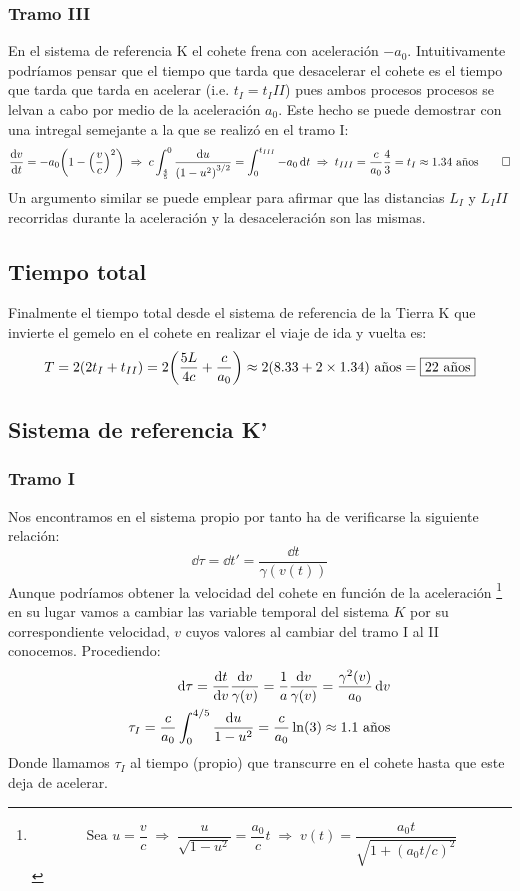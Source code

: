 \documentclass[11pt]{article}
\begin{document}
\subsubsection*{Tramo III} 
En el sistema de referencia K el cohete frena con aceleración $-a_0$. Intuitivamente podríamos pensar que el tiempo que tarda que desacelerar el cohete es el tiempo que tarda que tarda en acelerar (i.e. $t_I = t_III$) pues ambos procesos procesos se lelvan a cabo por medio de la aceleración $a_0$. Este hecho se puede demostrar con una intregal semejante a la que se realizó en el tramo I:
\begin{align*}
    \dv{v}{t} = -a_0 \qty(1 - \qty(\dfrac{v}{c})^2) \;\Rightarrow\; c\int_{\frac{4}{5}}^{0} \dfrac{\dd{u}}{\qty(1-u^2)^{3/2}} = \int_{0}^{t_{III}} -a_0 \dd{t} \;\Rightarrow\; t_{III} = \dfrac{c}{a_0}\dfrac{4}{3} = t_{I} \approx 1.34 \textrm{ años} \qed 
\end{align*}
Un argumento similar se puede emplear para afirmar que las distancias $L_I$ y $L_III$ recorridas durante la aceleración y la desaceleración son las mismas.
\subsection*{Tiempo total}
Finalmente el tiempo total desde el sistema de referencia de la Tierra K que invierte el gemelo en el cohete en realizar el viaje de ida y vuelta es: 
\begin{equation}
    T = 2(2t_I + t_{II}) = 2\qty(\dfrac{5L}{4c}+\dfrac{c}{a_0}) \approx 2(8.33 +2\times1.34) \textrm{ años} =  \fbox{\textrm{22 años}} 
\end{equation}
\subsection*{Sistema de referencia K'}
\subsubsection*{Tramo I}
Nos encontramos en el sistema propio por tanto ha de verificarse la siguiente relación: 
\begin{equation}
    \label{Tiempo propio}
    \dd{\tau} = \dd{t'} = \dfrac{\dd{t}}{\gamma(v(t))}
\end{equation}
Aunque podríamos obtener la velocidad del cohete en función de la aceleración \footnote{
    \begin{equation*}
        \textrm{Sea } u = \dfrac{v}{c} \;\Rightarrow\; \dfrac{u}{\sqrt{1-u^2}} = \dfrac{a_0}{c} t \;\Rightarrow\; v(t) = \dfrac{a_0 t}{\sqrt{1 + (a_0 t/c)^2}} 
    \end{equation*}
} en su lugar vamos a cambiar las variable temporal del sistema $K$ por su correspondiente velocidad, $v$ cuyos valores al cambiar del tramo I al II conocemos. Procediendo: 
\begin{align}
    \dd{\tau} = \dv{t}{v} \dfrac{\dd{v}}{\gamma(v)} = \dfrac{1}{a} \dfrac{\dd{v}}{\gamma(v)} = \dfrac{\gamma^2(v)}{a_0}\dd{v}\\
    \tau_I =  \dfrac{c}{a_0}\int_{0}^{4/5} \dfrac{\dd{u}}{1-u^2} = \dfrac{c }{a_0} \ln(3) \approx 1.1 \textrm{ años} 
\end{align} 
Donde llamamos $\tau_I$ al tiempo (propio) que transcurre en el cohete hasta que este deja de acelerar.
\end{document}
